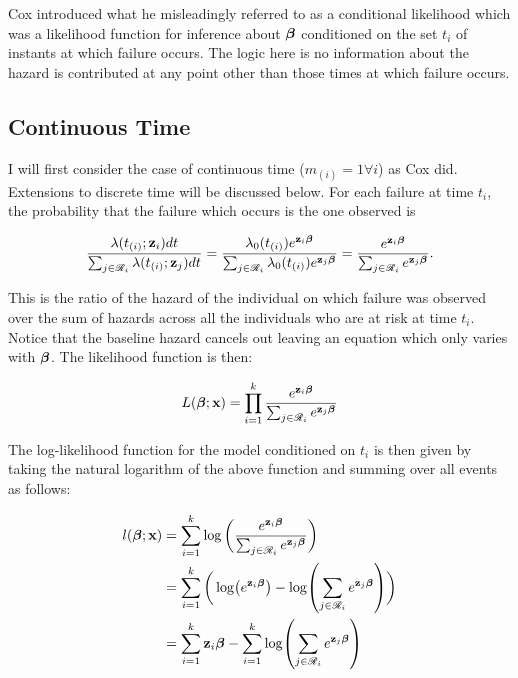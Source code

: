 Cox  introduced what he misleadingly referred to as a conditional likelihood which was a likelihood function for inference about $\boldsymbol{\beta}$ conditioned on the set ${t_i}$ of instants at which failure occurs. The logic here is no information about the hazard is contributed at any point other than those times at which failure occurs. 

\subsection{Continuous Time}

I will first consider the case of continuous time ($m_{(i)}=1\forall i$) as Cox  did. Extensions to discrete time will be discussed below. For each failure at time $t_i$, the probability that the failure which occurs is the one observed is 

\begin{equation}
    \frac{\lambda(t_{(i)}; \textbf{z}_i)dt}{\sum_{j\in\mathscr{R}_i}\lambda(t_{(i)}; \textbf{z}_{j})dt} = 
    \frac{\lambda_0(t_{(i)})e^{\textbf{z}_i\boldsymbol{\beta}}}{\sum_{j\in\mathscr{R}_i}\lambda_0(t_{(i)})e^{\textbf{z}_j\boldsymbol{\beta}}} = \frac{e^{\textbf{z}_i\boldsymbol{\beta}}}{\sum_{j\in\mathscr{R}_i}e^{\textbf{z}_j\boldsymbol{\beta}}}.
\end{equation}

This is the ratio of the hazard of the individual on which failure was observed over the sum of hazards across all the individuals who are at risk at time $t_i$. Notice that the baseline hazard cancels out leaving an equation which only varies with $\boldsymbol{\beta}$. The likelihood function is then:

\begin{equation}\label{partial-likelihood-eqn}
    L(\boldsymbol{\beta};\textbf{x}) = \prod_{i=1}^k \frac{e^{\textbf{z}_i\boldsymbol{\beta}}}{\sum_{j\in\mathscr{R}_i}e^{\textbf{z}_j\boldsymbol{\beta}}}
\end{equation}

The log-likelihood function for the model conditioned on ${t_i}$ is then given by taking the natural logarithm of the above function and summing over all events as follows:

\begin{align}
    l(\boldsymbol{\beta};\textbf{x}) &= \sum_{i=1}^k \log\bigg(\frac{e^{\textbf{z}_i\boldsymbol{\beta}}}{\sum_{j\in\mathscr{R}_i}e^{\textbf{z}_j\boldsymbol{\beta}}}\bigg)\\
    &= \sum_{i=1}^k \bigg( \log(e^{\textbf{z}_i\boldsymbol{\beta}}) - \log(\sum_{j\in\mathscr{R}_i}e^{\textbf{z}_j\boldsymbol{\beta}})\bigg)\\
    &= \sum_{i=1}^k \textbf{z}_i\boldsymbol{\beta} - \sum_{i=1}^k \log(\sum_{j\in\mathscr{R}_i}e^{\textbf{z}_j\boldsymbol{\beta}})
\end{align}

